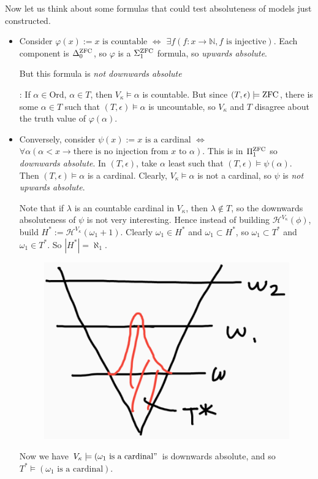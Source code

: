 \documentclass[12pt,a4paper]{article}
\newenvironment{subproof}
{\begin{changemargin}{0.5cm}{0.5cm} 
	}%
	{\end{changemargin}
}
\begin{document}
Now let us think about some formulas that could test absoluteness of models just constructed.
\begin{itemize}
\item Consider $\varphi(x) := x\text{ is countable}$ $\Leftrightarrow$ $\exists f(f: x\rightarrow \mathbb{N}, f \text{ is injective})$. Each component is $\Delta_0^{\text{ZFC}}$, so $\varphi$ is a $\Sigma_1^{\text{ZFC}}$ formula, so \emph{upwards absolute}.

\quad But this formula is \emph{not downwards absolute}
\begin{subproof}
: If $\alpha \in \text{Ord}$, $\alpha \in T$, then $V_{\kappa} \models \alpha$ is countable. But since $(T, \epsilon) \models \text{ZFC}$, there is some $\alpha \in T$ such that $(T, \epsilon) \models \alpha$ is uncountable, so $V_{\kappa}$ and $T$ disagree about the truth value of $\varphi(\alpha)$.
\end{subproof}

\item Conversely, consider $\psi(x) := x \text{ is a cardinal}$ $\Leftrightarrow$ $\forall \alpha (\alpha < x \rightarrow \text{there is no injection from } x \text{ to } \alpha)$. This is in $\Pi_1^{\text{ZFC}}$ so \emph{downwards absolute}. In $(T, \epsilon)$, take $\alpha$ least such that $(T, \epsilon) \models \psi(\alpha)$. Then $(T, \epsilon) \models \alpha$ is a cardinal. Clearly, $V_{\kappa} \models \alpha$ is not a cardinal, so $\psi$ is \emph{not upwards absolute}.
\s

Note that if $\lambda$ is an countable cardinal in $V_{\kappa}$, then $\lambda \not\in T$, so the downwards absoluteness of $\psi$ is not very interesting. Hence instead of building $\mathcal{H}^{V_{\kappa}}(\phi)$, build $H^* := \mathcal{H}^{V_{\kappa}}(\omega_1 +1)$. Clearly $\omega_1 \in H^*$ and $\omega_1 \subset H^*$, so $\omega_1 \subset T^*$ and $\omega_1 \in T^*$. So $|H^*| = \aleph_1$. 

\begin{figure}[h]
\begin{center}
    \includegraphics[scale=0.25]{7}
\end{center}
\end{figure}

Now we have $V_{\kappa} \models (\omega_1 \text{ is a cardinal}"$ is downwards absolute, and so $T^* \models (\omega_1 \text{ is a cardinal})$. 
\end{itemize}
\end{document}
